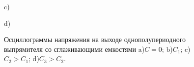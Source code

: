 \documentclass[12pt]{article}
\begin{document}
\begin{figure}[H]
\begin{minipage}[h]{0.47\linewidth}
		 c) \\
	\end{minipage}
	\hfill
	\begin{minipage}[h]{0.47\linewidth}
		 d) \\
	\end{minipage}
	\caption{Осциллограммы напряжения на выходе однополупериодного выпрямителя со сглаживающими емкостями a)$C = 0$; b)$C_1$; c)$C_2 > C_1$; d)$C_3 > C_2$.}
	\label{ris:image6}
\end{figure}
\end{document}
